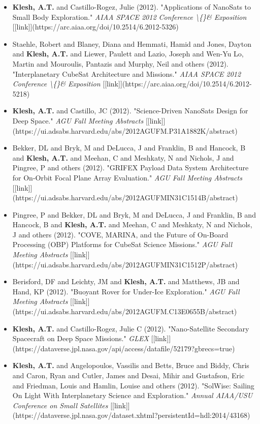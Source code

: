 \documentclass[11pt,letterpaper]{article}
\begin{document}
\begin{itemize}
\item \textbf{Klesh, A.T.} and Castillo-Rogez, Julie (2012). "Applications of NanoSats to Small Body Exploration." \textit{AIAA SPACE 2012 Conference \textbackslash\{\}\& Exposition} [[link]](https://arc.aiaa.org/doi/10.2514/6.2012-5326)
\item Staehle, Robert and Blaney, Diana and Hemmati, Hamid and Jones, Dayton and \textbf{Klesh, A.T.} and Liewer, Paulett and Lazio, Joseph and Wen-Yu Lo, Martin and Mouroulis, Pantazis and Murphy, Neil and others (2012). "Interplanetary CubeSat Architecture and Missions." \textit{AIAA SPACE 2012 Conference \textbackslash\{\}\& Exposition} [[link]](https://arc.aiaa.org/doi/10.2514/6.2012-5218)
\item \textbf{Klesh, A.T.} and Castillo, JC (2012). "Science-Driven NanoSats Design for Deep Space." \textit{AGU Fall Meeting Abstracts} [[link]](https://ui.adsabs.harvard.edu/abs/2012AGUFM.P31A1882K/abstract)
\item Bekker, DL and Bryk, M and DeLucca, J and Franklin, B and Hancock, B and \textbf{Klesh, A.T.} and Meehan, C and Meshkaty, N and Nichols, J and Pingree, P and others (2012). "GRIFEX Payload Data System Architecture for On-Orbit Focal Plane Array Evaluation." \textit{AGU Fall Meeting Abstracts} [[link]](https://ui.adsabs.harvard.edu/abs/2012AGUFMIN31C1514B/abstract)
\item Pingree, P and Bekker, DL and Bryk, M and DeLucca, J and Franklin, B and Hancock, B and \textbf{Klesh, A.T.} and Meehan, C and Meshkaty, N and Nichols, J and others (2012). "COVE, MARINA, and the Future of On-Board Processing (OBP) Platforms for CubeSat Science Missions." \textit{AGU Fall Meeting Abstracts} [[link]](https://ui.adsabs.harvard.edu/abs/2012AGUFMIN31C1512P/abstract)
\item Berisford, DF and Leichty, JM and \textbf{Klesh, A.T.} and Matthews, JB and Hand, KP (2012). "Buoyant Rover for Under-Ice Exploration." \textit{AGU Fall Meeting Abstracts} [[link]](https://ui.adsabs.harvard.edu/abs/2012AGUFM.C13E0655B/abstract)
\item \textbf{Klesh, A.T.} and Castillo-Rogez, Julie C (2012). "Nano-Satellite Secondary Spacecraft on Deep Space Missions." \textit{GLEX} [[link]](https://dataverse.jpl.nasa.gov/api/access/datafile/52179?gbrecs=true)
\item \textbf{Klesh, A.T.} and Angelopoulos, Vassilis and Betts, Bruce and Biddy, Chris and Caron, Ryan and Cutler, James and Desai, Mihir and Gustafson, Eric and Friedman, Louis and Hamlin, Louise and others (2012). "SolWise: Sailing On Light With Interplanetary Science and Exploration." \textit{Annual AIAA/USU Conference on Small Satellites} [[link]](https://dataverse.jpl.nasa.gov/dataset.xhtml?persistentId=hdl:2014/43168)

\end{itemize}
\end{document}
